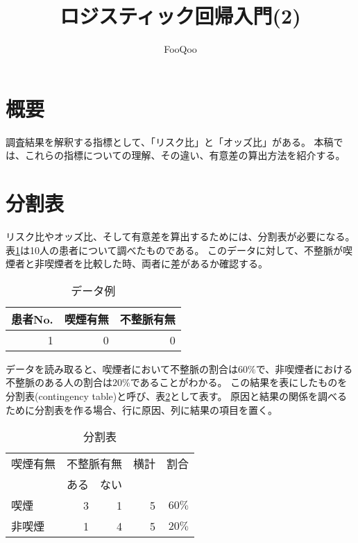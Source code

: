 \documentclass{ltjsarticle}
\title{ロジスティック回帰入門(2)}
\author{FooQoo}
\begin{document}
\maketitle
\section{概要}
調査結果を解釈する指標として、「リスク比」と「オッズ比」がある。
本稿では、これらの指標についての理解、その違い、有意差の算出方法を紹介する。

\section{分割表}
リスク比やオッズ比、そして有意差を算出するためには、分割表が必要になる。
表\ref{tbl:sample}は10人の患者について調べたものである。
このデータに対して、不整脈が喫煙者と非喫煙者を比較した時、両者に差があるか確認する。

\begin{table}[b]
    \caption{データ例}
    \label{tbl:sample}
    \centering
    \begin{tabular}{r|r|r} \hline
        \multicolumn{1}{l}{患者No.} & \multicolumn{1}{|l|}{喫煙有無} & \multicolumn{1}{l}{不整脈有無} \\ \hline \hline
        1 & 0 & 0 \\ \hline
    \end{tabular}
\end{table}

データを読み取ると、喫煙者において不整脈の割合は$60\%$で、非喫煙者における不整脈のある人の割合は$20\%$であることがわかる。
この結果を表にしたものを分割表(contingency table)と呼び、表\ref{tbl:c}として表す。
原因と結果の関係を調べるために分割表を作る場合、行に原因、列に結果の項目を置く。

\begin{table}[b]
    \caption{分割表}
    \label{tbl:c}
    \centering
    \begin{tabular}{l|r|r|r|r} \hline 
        \multicolumn{1}{l}{喫煙有無} & \multicolumn{2}{|l|}{不整脈有無} & \multicolumn{1}{l|}{横計} & \multicolumn{1}{l}{割合}\\ \cline{2-3}
        & ある & ない & & \\ \hline \hline
        喫煙 & 3 & 1 & 5 & $60\%$ \\
        非喫煙 & 1 & 4 & 5 & $20\%$ \\ \hline 
    \end{tabular}
\end{table}
\end{document}
